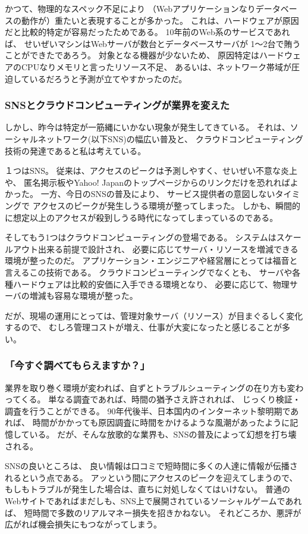 かつて、物理的なスペック不足により
（Webアプリケーションなりデータベースの動作が）重たいと表現することが多かった。
これは、ハードウェアが原因だと比較的特定が容易だったためである。
10年前のWeb系のサービスであれば、
せいぜいマシンはWebサーバが数台とデータベースサーバが
1～2台で賄うことができたであろう。
対象となる機器が少ないため、
原因特定はハードウェアのCPUなりメモリと言ったリソース不足、
あるいは、ネットワーク帯域が圧迫しているだろうと予測が立てやすかったのだ。

\subsubsection{SNSとクラウドコンピューティングが業界を変えた}
しかし、昨今は特定が一筋縄にいかない現象が発生してきている。
それは、ソーシャルネットワーク(以下SNS)の幅広い普及と、
クラウドコンピューティング技術の発達であると私は考えている。

１つはSNS。
従来は、アクセスのピークは予測しやすく、せいぜい不意な炎上や、
匿名掲示板やYahoo! Japanのトップページからのリンクだけを恐れればよかった。
一方、今日のSNSの普及により、
サービス提供者の意図しないタイミングで
アクセスのピークが発生しうる環境が整ってしまった。
しかも、瞬間的に想定以上のアクセスが殺到しうる時代になってしまっているのである。

そしてもう1つはクラウドコンピューティングの登場である。
システムはスケールアウト出来る前提で設計され、
必要に応じてサーバ・リソースを増減できる環境が整ったのだ。
アプリケーション・エンジニアや経営層にとっては福音と言えるこの技術である。
クラウドコンピューティングでなくとも、
サーバや各種ハードウェアは比較的安価に入手できる環境となり、
必要に応じて、物理サーバの増減も容易な環境が整った。

だが、現場の運用にとっては、管理対象サーバ（リソース）が目まぐるしく変化するので、
むしろ管理コストが増え、仕事が大変になったと感じることが多い。

\subsubsection{「今すぐ調べてもらえますか？」}
業界を取り巻く環境が変われば、自ずとトラブルシューティングの在り方も変わってくる。
単なる調査であれば、時間の猶予さえ許されれば、
じっくり検証・調査を行うことができる。
90年代後半、日本国内のインターネット黎明期であれば、
時間がかかっても原因調査に時間をかけるような風潮があったように記憶している。
だが、そんな放歌的な業界も、SNSの普及によって幻想を打ち壊される。

SNSの良いところは、
良い情報は口コミで短時間に多くの人達に情報が伝播されるという点である。
アッという間にアクセスのピークを迎えてしまうので、
もしもトラブルが発生した場合は、直ちに対処しなくてはいけない。
普通のWebサイトであればまだしも、SNS上で展開されているソーシャルゲームであれば、
短時間で多数のリアルマネー損失を招きかねない。
それどころか、悪評が広がれば機会損失にもつながってしまう。

